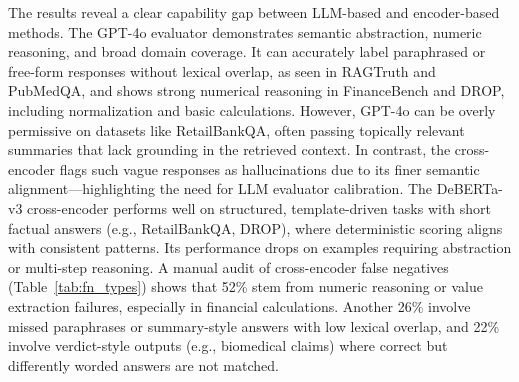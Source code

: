 \documentclass[11pt]{article}
\begin{document}
\begin{table}[ht]
\centering
\small
{}
\caption{Summary of dominant cross-encoder false negative types (mutually exclusive assignment).}
\label{tab:fn_types}
\end{table}

The results reveal a clear capability gap between LLM-based and encoder-based methods. The GPT-4o evaluator demonstrates semantic abstraction, numeric reasoning, and broad domain coverage. It can accurately label paraphrased or free-form responses without lexical overlap, as seen in RAGTruth and PubMedQA, and shows strong numerical reasoning in FinanceBench and DROP, including normalization and basic calculations.
However, GPT-4o can be overly permissive on datasets like RetailBankQA, often passing topically relevant summaries that lack grounding in the retrieved context. In contrast, the cross-encoder flags such vague responses as hallucinations due to its finer semantic alignment—highlighting the need for LLM evaluator calibration.
The DeBERTa-v3 cross-encoder performs well on structured, template-driven tasks with short factual answers (e.g., RetailBankQA, DROP), where deterministic scoring aligns with consistent patterns. Its performance drops on examples requiring abstraction or multi-step reasoning.
A manual audit of cross-encoder false negatives (Table~\ref{tab:fn_types}) shows that 52\% stem from numeric reasoning or value extraction failures, especially in financial calculations. Another 26\% involve missed paraphrases or summary-style answers with low lexical overlap, and 22\% involve verdict-style outputs (e.g., biomedical claims) where correct but differently worded answers are not matched.
\end{document}
